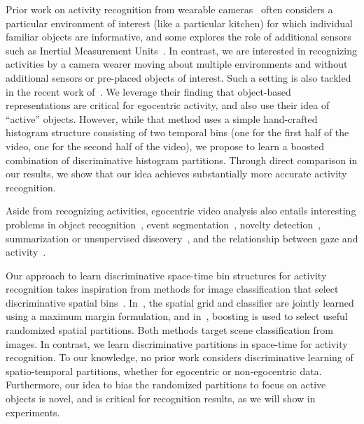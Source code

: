 
Prior work on activity recognition from wearable cameras~\cite{Sundaram,Hanheide,Fathi-ICCV2011} often considers a particular environment of interest (like a particular kitchen) for which individual familiar objects are informative, and some explores the role of additional sensors such as Inertial Measurement Units~\cite{Spriggs}.  In contrast, we are interested in recognizing activities by a camera wearer moving about multiple environments and without additional sensors or pre-placed objects of interest.  Such a setting is also tackled in the recent work of~\cite{Ramanan12}.  We leverage their finding that object-based representations are critical for egocentric activity, and also use their idea of ``active'' objects.  However, while that method uses a simple hand-crafted histogram structure consisting of two temporal bins (one for the first half of the video, one for the second half of the video), we propose to learn a boosted combination of discriminative histogram partitions.  Through direct comparison in our results, we show that our idea achieves substantially more accurate activity recognition.

Aside from recognizing activities, egocentric video analysis also entails interesting problems in object recognition~\cite{ren-gu-cvpr2010}, event segmentation~\cite{clarkson}, novelty detection~\cite{novelty}, summarization or unsupervised discovery~\cite{jojic,kitani,Lee12}, and the relationship between gaze and activity~\cite{Fathi12}.




Our approach to learn discriminative space-time bin structures for activity recognition takes inspiration from methods for image classification that select discriminative spatial bins~\cite{Sharma11,Jiang12}.  In~\cite{Sharma11}, the spatial grid and classifier are jointly learned using a maximum margin formulation, and in~\cite{Jiang12}, boosting is used to select useful randomized spatial partitions.  Both methods target scene classification from images.  In contrast, we learn discriminative partitions in space-time for activity recognition.  To our knowledge, no prior work considers discriminative learning of spatio-temporal partitions, whether for egocentric or non-egocentric data.  Furthermore, our idea to bias the randomized partitions to focus on active objects is novel, and is critical for recognition results, as we will show in experiments.


